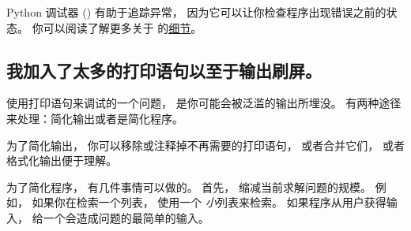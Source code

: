 
Python 调试器 () 有助于追踪异常， 因为它可以让你检查程序出现错误之前的状态。
你可以阅读了解更多关于  的\href{https://docs.python.org/3/library/pdb.html}{细节}。

\subsection{我加入了太多的打印语句以至于输出刷屏。}



使用打印语句来调试的一个问题， 是你可能会被泛滥的输出所埋没。
有两种途径来处理：简化输出或者是简化程序。


为了简化输出， 你可以移除或注释掉不再需要的打印语句， 或者合并它们， 或者格式化输出便于理解。


为了简化程序， 有几件事情可以做的。  首先， 缩减当前求解问题的规模。
例如， 如果你在检索一个列表， 使用一个 {\em 小}列表来检索。
如果程序从用户获得输入， 给一个会造成问题的最简单的输入。


